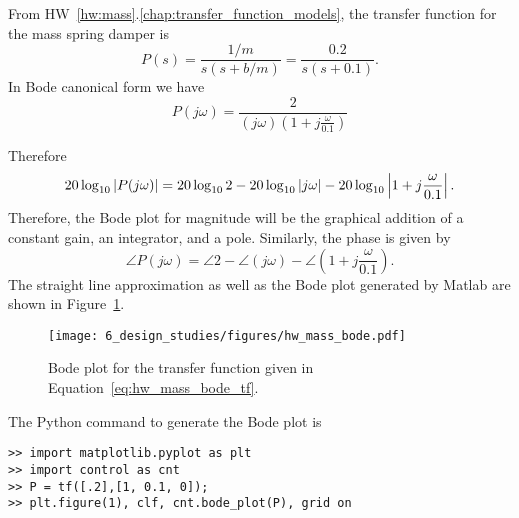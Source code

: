 From HW~\ref{hw:mass}.\ref{chap:transfer_function_models}, the transfer function for the mass spring damper is 
\begin{equation}\label{eq:hw_mass_bode_tf}
P(s) = \frac{1/m}{s(s+b/m)} = \frac{0.2}{s(s+0.1)}.
\end{equation}
In Bode canonical form we have
\[
P(j\omega) = \frac{2}{(j\omega)(1+j\frac{\omega}{0.1})}
\]

Therefore
\[
20\log_{10}\left|P(j\omega)\right|=
	20\log_{10} 2 
	-20\log_{10}\left|j\omega\right|
	-20\log_{10}\left|1+j\frac{\omega}{0.1}\right|.
\]
Therefore, the Bode plot for magnitude will be the graphical addition of a constant gain, an integrator, and a pole.
Similarly, the phase is given by
\[
\angle P(j\omega) = 
	\angle 2 
	- \angle (j\omega)
	- \angle (1+j\frac{\omega}{0.1}).
\]
The straight line approximation as well as the Bode plot generated by Matlab are shown in Figure~\ref{fig:hw_mass_bode}.
\begin{figure}[H]
   \centering
   \texttt{[image: 6\_design\_studies/figures/hw\_mass\_bode.pdf]}
   \caption{Bode plot for the transfer function given in Equation~\eqref{eq:hw_mass_bode_tf}.}
   \label{fig:hw_mass_bode}
\end{figure}

The Python command to generate the Bode plot is
\begin{lstlisting}
>> import matplotlib.pyplot as plt
>> import control as cnt
>> P = tf([.2],[1, 0.1, 0]);
>> plt.figure(1), clf, cnt.bode_plot(P), grid on
\end{lstlisting}
